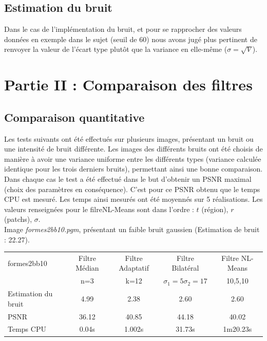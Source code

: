 \documentclass[a4,12pt]{article}
\begin{document}
\subsection{Estimation du bruit}
Dans le cas de l'implémentation du bruit, et pour se rapprocher des valeurs données en exemple dans le sujet (seuil de 60) nous avons jugé plus pertinent de renvoyer la valeur de l'écart type plutôt que la variance en elle-même ($\sigma = \sqrt{V}$).


\section{Partie II : Comparaison des filtres}
\subsection{Comparaison quantitative}

Les tests suivants ont été effectués sur plusieurs images, présentant un bruit ou une intensité de bruit différente. Les images des différents bruits ont été choisis de manière à avoir une variance uniforme entre les différents types (variance calculée identique pour les trois derniers bruits), permettant ainsi une bonne comparaison.\\

Dans chaque cas le test a été effectué dans le but d'obtenir un PSNR maximal (choix des paramètres en conséquence). C'est pour ce PSNR obtenu que le temps CPU est mesuré. Les temps ainsi mesurés ont été moyennés sur 5 réalisations. Les valeurs renseignées pour le filreNL-Means sont dans l'ordre : $t$ (région), $r$ (patchs), $\sigma$.\\

Image \textit{formes2bb10.pgm}, présentant un faible bruit gaussien (Estimation de bruit : 22.27).

\begin{center}
\begin{tabular}{|l||c|c|c|c|}
\hline
formes2bb10 & Filtre Médian & Filtre Adaptatif & Filtre Bilatéral & Filtre NL-Means \\
& n=3 & k=12 & $\sigma_1 = 5 \sigma_2 = 17$ & 10,5,10\\
\hline
Estimation du bruit
& 4.99
& 2.38
& 2.60
& 2.60\\
\hline
PSNR
& 36.12
& 40.85
& 44.18
& 40.02\\
\hline
Temps CPU
& 0.04s 
& 1.002s
& 31.73s
& 1m20.23s\\
\hline
\end{tabular} 
\end{center}
\end{document}
